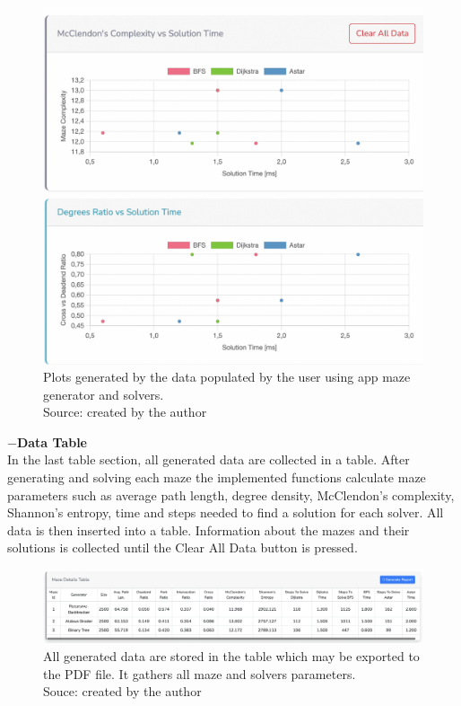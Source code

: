 \begin{figure}[!h]
    \centering
    \centering
    \includegraphics[scale = 0.3]{charts}
    \caption{Plots generated by the data populated by the user using app maze generator and solvers.\\Source: created by the author}
    \end{figure}
\newline    
\textbf{$-$Data Table}\\
In the last table section, all generated data are collected in a table. After generating and solving each maze the implemented functions calculate maze parameters
such as average path length, degree density, McClendon's complexity, Shannon's entropy, time and steps needed to find a solution for each solver. All data is 
then inserted into a table. Information about the mazes and their solutions is collected until the Clear All Data button is pressed.\\
\begin{figure}[!h]
    \centering
    \centering
    \includegraphics[width = 1 \linewidth]{table}
    \caption{All generated data are stored in the table which may be exported to the PDF file. It gathers all maze and solvers parameters.\\ Souce: created by the author }
    \end{figure}
\newline  